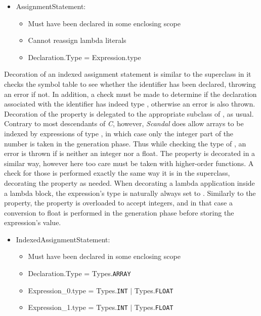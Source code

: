 \begin{itemize}
	\item AssignmentStatement:
		\begin{itemize}
			\item Must have been declared in some enclosing scope
			\item Cannot reassign lambda literals
			\item Declaration.Type = Expression.type
		\end{itemize}
\end{itemize}

Decoration of an indexed assignment statement is similar to the superclass in it checks the symbol table to see whether the identifier has been declared, throwing an error if not. In addition, a check must be made to determine if the declaration associated with the identifier has indeed type , otherwise an error is also thrown. Decoration of the  property is delegated to the appropriate subclass of , as usual. Contrary to most descendants of \emph{C}, however, \emph{Scandal} does allow arrays to be indexed by expressions of type , in which case only the integer part of the number is taken in the generation phase. Thus while checking the type of , an error is thrown if is neither an integer nor a float. The  property is decorated in a similar way, however here too care must be taken with higher-order functions. A check for those is performed exactly the same way it is in the superclass, decorating the  property as needed. When decorating a lambda application inside a lambda block, the expression's type is naturally always set to . Similarly to the  property, the  property is overloaded to accept integers, and in that case a conversion to float is performed in the generation phase before storing the expression's value.

\begin{itemize}
	\item IndexedAssignmentStatement:
		\begin{itemize}
			\item Must have been declared in some enclosing scope
			\item Declaration.Type = Types.\texttt{ARRAY}
			\item Expression\_0.type = Types.\texttt{INT} $|$ Types.\texttt{FLOAT}
			\item Expression\_1.type = Types.\texttt{INT} $|$ Types.\texttt{FLOAT}
		\end{itemize}
\end{itemize}

